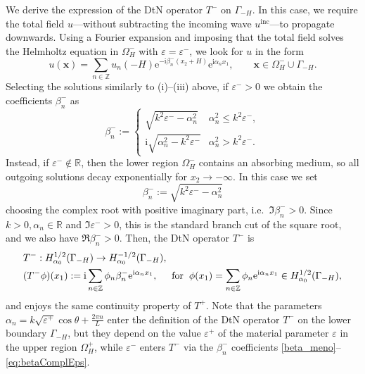 \documentclass[a4paper,10pt]{article}
\newcommand{\IR}{{\mathbb R}}
\newcommand{\IZ}{{\mathbb Z}}
\newcommand{\bx}{{\mathbf x}}
\newcommand{\ri}{{\mathrm i}}
\newcommand{\re}{{\mathrm e}}
\newcommand{\inc}{{\mathrm{inc}}}
\newcommand{\GmH}{{\Gamma_{-H}}}
\begin{document}
We derive the expression of the DtN operator $T^-$ on $\GmH$.
In this case, we require the total field $u$---without subtracting the incoming wave $u^\inc$---to propagate downwards. 
Using a Fourier expansion and imposing that the total field solves the Helmholtz equation in $\Omega_H^-$ with $\varepsilon=\varepsilon^-$, we look for $u$ in the form
\begin{equation*}%
u(\bx)=\sum_{n\in\mathbb{Z}} u_n(-H)\re^{-\ri\beta_n^- (x_2+H)} \re^{\ri\alpha_n x_1},    \qquad \bx\in\Omega_H^-\cup\GmH.
\end{equation*}
Selecting the solutions similarly to (i)--(iii) above, if $\varepsilon^->0$ we obtain the coefficients
$\beta_n^-$ as
\begin{equation} \label{beta_meno}
\beta_n^- := \begin{cases} \sqrt{k^2\varepsilon^- - \alpha_n^2} & \alpha_n^2 \leq k^2\varepsilon^-, \\ 
	\ri\sqrt{\alpha_n^2-k^2\varepsilon^-} & \alpha_n^2 > k^2\varepsilon^-. \end{cases} 
	\end{equation}
	Instead, if $\varepsilon^-\notin\IR$, then the lower region $\Omega_H^-$ contains an absorbing medium, so all outgoing solutions decay exponentially for $x_2\to-\infty$.
	In this case we set 
	\begin{equation}\label{eq:betaComplEps}
\beta_n^-:=\sqrt{k^2\varepsilon^--\alpha_n^2} 
\end{equation}
choosing the complex root with positive imaginary part, i.e.\ $\Im\beta_n^->0$.
Since $k>0,\alpha_n\in\IR$ and $\Im\varepsilon^->0$, this is the standard branch cut of the square root, and we also have $\Re\beta_n^->0$.
Then, the DtN operator $T^-$ is
\begin{align} \label{DtN_meno}
& T^-:H^{1/2}_{\alpha_0}(\GmH) \to H^{-1/2}_{\alpha_0}(\GmH), \\ \nonumber
& (T^- \phi)(x_1) := \ri \sum_{n\in\mathbb{Z}} \phi_n \beta_n^- \re^{\ri\alpha_n x_1}, \hspace{0.5cm} \text{for} \hspace{0.2cm} 
\phi(x_1)=\sum_{n\in\IZ}\phi_n  \re^{\ri\alpha_nx_1} \in H^{1/2}_{\alpha_0}(\GmH),
\end{align}
and enjoys the same continuity property of $T^+$.
Note that the parameters $\alpha_n=k\sqrt{\varepsilon^+}\cos\theta+\frac{2\pi n}L$ enter the definition of the DtN operator $T^-$ on the lower boundary $\GmH$, but they depend on the value $\varepsilon^+$ of the material parameter $\varepsilon$ in the upper region $\Omega_H^+$, while $\varepsilon^-$ enters $T^-$ via the $\beta_n^-$ coefficients \eqref{beta_meno}--\eqref{eq:betaComplEps}.
\end{document}
